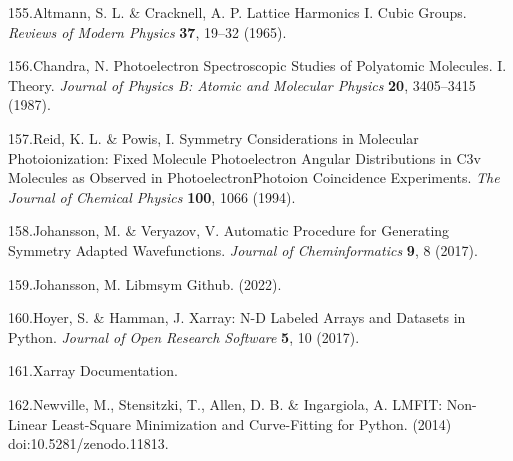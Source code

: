 \documentclass[10pt]{article}
\begin{document}
\label{csl:155}155.Altmann, S. L. \& Cracknell, A. P. {Lattice Harmonics {{I}}. {{Cubic}} Groups}. \textit{Reviews of Modern Physics} \textbf{37}, 19–32 (1965).

\label{csl:156}156.Chandra, N. {Photoelectron Spectroscopic Studies of Polyatomic Molecules. {{I}}. {{Theory}}}. \textit{Journal of Physics B: Atomic and Molecular Physics} \textbf{20}, 3405–3415 (1987).

\label{csl:157}157.Reid, K. L. \& Powis, I. {Symmetry Considerations in Molecular Photoionization: {{Fixed}} Molecule Photoelectron Angular Distributions in {{C3v}} Molecules as Observed in Photoelectron\textendash Photoion Coincidence Experiments}. \textit{The Journal of Chemical Physics} \textbf{100}, 1066 (1994).

\label{csl:158}158.Johansson, M. \& Veryazov, V. {Automatic Procedure for Generating Symmetry Adapted Wavefunctions}. \textit{Journal of Cheminformatics} \textbf{9}, 8 (2017).

\label{csl:159}159.Johansson, M. {Libmsym {{Github}}}. (2022).

\label{csl:160}160.Hoyer, S. \& Hamman, J. {Xarray: {{N-D}} Labeled {{Arrays}} and {{Datasets}} in {{Python}}}. \textit{Journal of Open Research Software} \textbf{5}, 10 (2017).

\label{csl:161}161.{Xarray Documentation}.

\label{csl:162}162.Newville, M., Stensitzki, T., Allen, D. B. \& Ingargiola, A. {{{LMFIT}}: {{Non-Linear Least-Square Minimization}} and {{Curve-Fitting}} for {{Python}}}. (2014) doi:10.5281/zenodo.11813.
\end{document}
